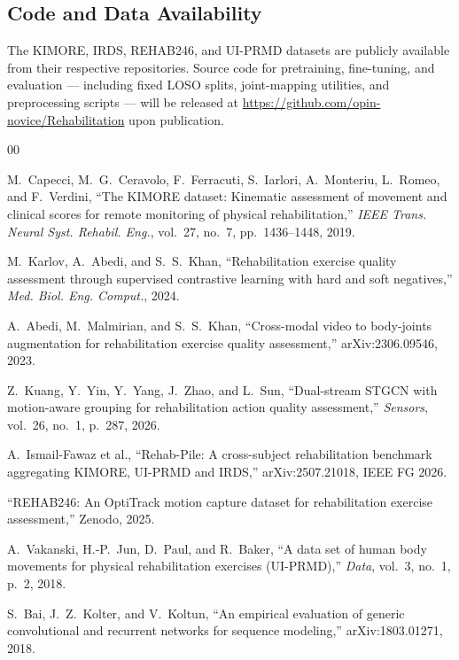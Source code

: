 \documentclass[10pt,journal]{IEEEtran}
\begin{document}
\subsection*{Code and Data Availability}
The KIMORE, IRDS, REHAB246, and UI-PRMD datasets are publicly available from their respective repositories. Source code for pretraining, fine-tuning, and evaluation --- including fixed LOSO splits, joint-mapping utilities, and preprocessing scripts --- will be released at \url{https://github.com/opin-novice/Rehabilitation} upon publication.

\begin{thebibliography}{00}

M.~Capecci, M.~G.~Ceravolo, F.~Ferracuti, S.~Iarlori, A.~Monteriu, L.~Romeo, and F.~Verdini,
``The KIMORE dataset: Kinematic assessment of movement and clinical scores for remote monitoring of physical rehabilitation,''
\textit{IEEE Trans. Neural Syst. Rehabil. Eng.}, vol.~27, no.~7, pp.~1436--1448, 2019.

M.~Karlov, A.~Abedi, and S.~S.~Khan,
``Rehabilitation exercise quality assessment through supervised contrastive learning with hard and soft negatives,''
\textit{Med. Biol. Eng. Comput.}, 2024.

A.~Abedi, M.~Malmirian, and S.~S.~Khan,
``Cross-modal video to body-joints augmentation for rehabilitation exercise quality assessment,''
arXiv:2306.09546, 2023.

Z.~Kuang, Y.~Yin, Y.~Yang, J.~Zhao, and L.~Sun,
``Dual-stream STGCN with motion-aware grouping for rehabilitation action quality assessment,''
\textit{Sensors}, vol.~26, no.~1, p.~287, 2026.

A.~Ismail-Fawaz et al.,
``Rehab-Pile: A cross-subject rehabilitation benchmark aggregating KIMORE, UI-PRMD and IRDS,''
arXiv:2507.21018, IEEE FG 2026.

``REHAB246: An OptiTrack motion capture dataset for rehabilitation exercise assessment,''
Zenodo, 2025.

A.~Vakanski, H.-P.~Jun, D.~Paul, and R.~Baker,
``A data set of human body movements for physical rehabilitation exercises (UI-PRMD),''
\textit{Data}, vol.~3, no.~1, p.~2, 2018.

S.~Bai, J.~Z.~Kolter, and V.~Koltun,
``An empirical evaluation of generic convolutional and recurrent networks for sequence modeling,''
arXiv:1803.01271, 2018.


\end{thebibliography}
\end{document}
